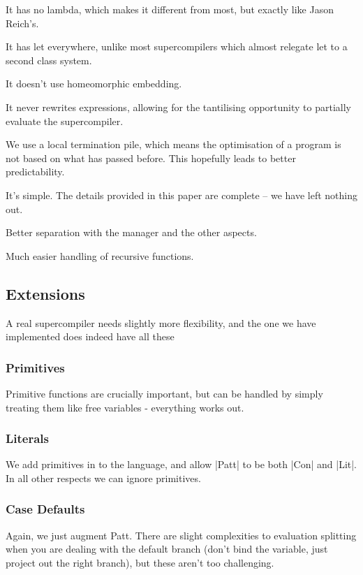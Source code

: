 \documentclass{sigplanconf}
\begin{document}
It has no lambda, which makes it different from most, but exactly like Jason Reich's.

It has let everywhere, unlike most supercompilers which almost relegate let to a second class system.

It doesn't use homeomorphic embedding.

It never rewrites expressions, allowing for the tantilising opportunity to partially evaluate the supercompiler.

We use a local termination pile, which means the optimisation of a program is not based on what has passed before. This hopefully leads to better predictability.

It's simple. The details provided in this paper are complete -- we have left nothing out.

Better separation with the manager and the other aspects.

Much easier handling of recursive functions.

\subsection{Extensions}
\label{sec:extensions}

A real supercompiler needs slightly more flexibility, and the one we have implemented does indeed have all these

\subsubsection{Primitives}

Primitive functions are crucially important, but can be handled by simply treating them like free variables - everything works out.

\subsubsection{Literals}

We add primitives in to the language, and allow |Patt| to be both |Con| and |Lit|. In all other respects we can ignore primitives.

\subsubsection{Case Defaults}

Again, we just augment Patt. There are slight complexities to evaluation splitting when you are dealing with the default branch (don't bind the variable, just project out the right branch), but these aren't too challenging.
\end{document}
